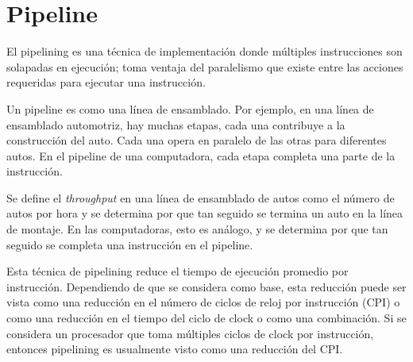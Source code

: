  
\chapter{Pipeline}
El pipelining es una técnica de implementación donde múltiples instrucciones son solapadas en ejecución; toma ventaja del paralelismo que existe entre las acciones requeridas para ejecutar una instrucción.

Un pipeline es como una línea de ensamblado. Por ejemplo, en una línea de ensamblado automotriz, hay muchas etapas, cada una contribuye a la construcción del auto. Cada una opera en paralelo de las otras para diferentes autos. En el pipeline de una computadora, cada etapa completa una parte de la instrucción.

Se define el \textit{throughput} en una línea de ensamblado de autos como el número de autos por hora y se determina por que tan seguido se termina un auto en la línea de montaje. En las computadoras, esto es análogo, y se determina por que tan seguido se completa una instrucción en el pipeline.

Esta técnica de pipelining reduce el tiempo de ejecución promedio por instrucción. Dependiendo de que se considera como base, esta reducción puede ser vista como una reducción en el número de ciclos de reloj por instrucción (CPI) o como una reducción en el tiempo del ciclo de clock o como una combinación. Si se considera un procesador que toma múltiples ciclos de clock por instrucción, entonces pipelining es usualmente visto como una reducción del CPI.

